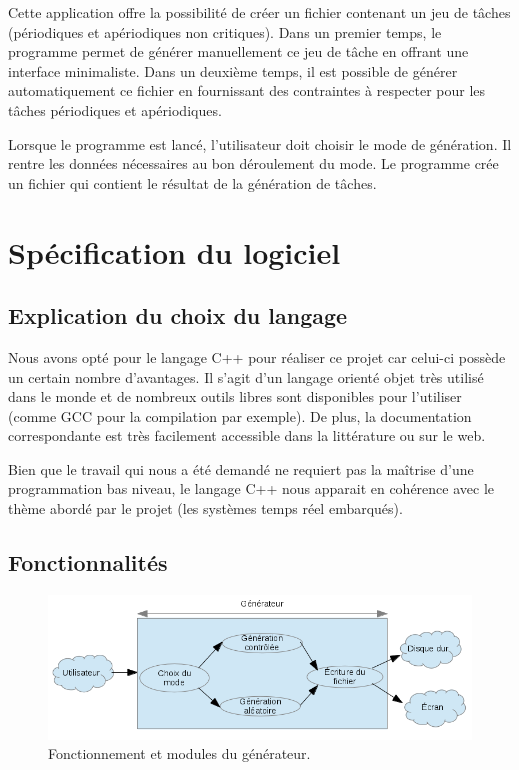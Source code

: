 	Cette application offre la possibilité de créer un fichier contenant un jeu de tâches (périodiques et apériodiques non critiques).
	Dans un premier temps, le programme permet de générer manuellement ce jeu de tâche en offrant une interface minimaliste.
	Dans un deuxième temps, il est possible de générer automatiquement ce fichier en fournissant des contraintes à respecter pour les tâches périodiques et apériodiques.
	
	
	Lorsque le programme est lancé, l’utilisateur doit choisir le mode de génération. Il rentre les données nécessaires au bon déroulement du mode. Le programme crée un fichier qui contient le résultat de la génération de tâches.


	\section{Spécification du logiciel}

		\subsection{Explication du choix du langage}
	
			\label{sec:langage}
			Nous avons opté pour le langage C++ pour réaliser ce projet car celui-ci possède un certain nombre d'avantages. Il s'agit d'un langage orienté objet très utilisé dans le monde et de nombreux outils libres sont disponibles pour l'utiliser (comme GCC pour la compilation par exemple). De plus, la documentation correspondante est très facilement accessible dans la littérature ou sur le web.
		
			Bien que le travail qui nous a été demandé ne requiert pas la maîtrise d'une programmation bas niveau, le langage C++ nous apparait en cohérence avec le thème abordé par le projet (les systèmes temps réel embarqués).

		\subsection{Fonctionnalités}
			\begin{figure}
				\centering
				\includegraphics[scale=0.9]{img/schema_gen.png}
				\caption{Fonctionnement et modules du générateur.}
			\end{figure}
			\FloatBarrier
		    
